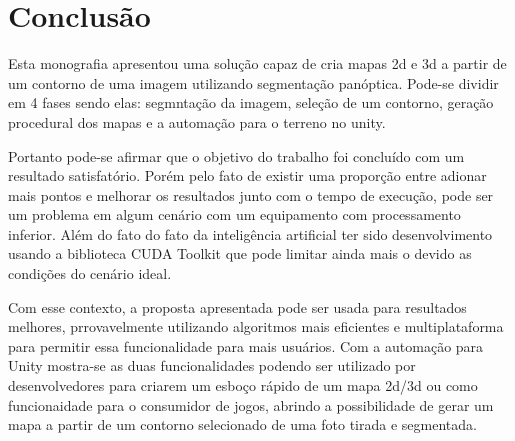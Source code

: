 \section{Conclusão}

Esta monografia apresentou uma solução capaz de cria mapas 2d e 3d a partir de um contorno de uma imagem utilizando segmentação panóptica. Pode-se dividir em 4 fases sendo elas: segmntação da imagem, seleção de um contorno, geração procedural dos mapas e a automação para o terreno no unity.

Portanto pode-se afirmar que o objetivo do trabalho foi concluído com um resultado satisfatório. Porém pelo fato de existir uma proporção entre adionar mais pontos e melhorar os resultados junto com o tempo de execução, pode ser um problema em algum cenário com um equipamento com processamento inferior. Além do fato do fato da inteligência artificial ter sido desenvolvimento usando a biblioteca CUDA Toolkit que pode limitar ainda mais o devido as condições do cenário ideal.

Com esse contexto, a proposta apresentada pode ser usada para resultados melhores, prrovavelmente utilizando algoritmos mais eficientes e multiplataforma para permitir essa funcionalidade para mais usuários. Com a automação para Unity mostra-se as duas funcionalidades podendo ser utilizado por desenvolvedores para criarem um esboço rápido de um mapa 2d/3d ou como funcionaidade para o consumidor de jogos, abrindo a possibilidade de gerar um mapa a partir de um contorno selecionado de uma foto tirada e segmentada.